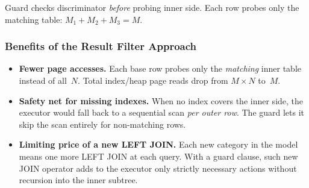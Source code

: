 \documentclass{beamer}
\begin{document}
\begin{frame}
\begin{center}
\end{center}
\vspace{-2mm}
{\small Guard checks discriminator \emph{before} probing inner side.
Each row probes only the matching table: $M_1\!+\!M_2\!+\!M_3 = M$.}
\end{frame}

\begin{frame}\frametitle{Benefits of the Result Filter Approach}

\begin{itemize}
  \item \textbf{Fewer page accesses.}\;
    Each base row probes only the \emph{matching} inner table instead of
    all~$N$.  Total index/heap page reads drop from $M \times N$ to~$M$.

  \item \textbf{Safety net for missing indexes.}\;
    When no index covers the inner side, the executor would fall back to a
    sequential scan \emph{per outer row}.  The guard lets it skip the scan
    entirely for non-matching rows.

  \item \textbf{Limiting price of a new LEFT JOIN.}\;
    Each new category in the model means one more LEFT JOIN at each query. With a guard clause, such new JOIN operator adds to the executor only strictly necessary actions without recursion into the inner subtree.
\end{itemize}

\end{frame}
\end{document}
